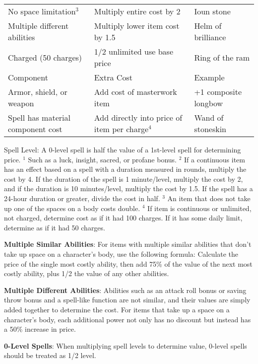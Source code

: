 \begin{table}[]
\begin{tabular}{lll}
 No space limitation\(^{3}\) & Multiply entire cost by 2 & Ioun stone \\
 Multiple different abilities & Multiply lower item cost by 1.5  & Helm of brilliance \\
 Charged (50 charges) & 1/2 unlimited use base price & Ring of the ram\\
Component & Extra Cost & Example\\
Armor, shield, or weapon & Add cost of masterwork item & +1 composite longbow \\
 Spell has material component cost & Add directly into price of item per charge\(^{4}\) & Wand of stoneskin\\
 \end{tabular}
Spell Level: A 0-level spell is half the value of a 1st-level spell for determining price.
\(^{1}\) Such as a luck, insight, sacred, or profane bonus.
\(^{2}\) If a continuous item has an effect based on a spell with a duration measured in rounds, multiply the cost by 4. If the duration of the spell is 1 minute/level, multiply the cost by 2, and if the duration is 10 minutes/level, multiply the cost by 1.5. If the spell has a 24-hour duration or greater, divide the cost in half.
\(^{3}\) An item that does not take up one of the spaces on a body costs double.
\(^{4}\) If item is continuous or unlimited, not charged, determine cost as if it had 100 charges. If it has some daily limit, determine as if it had 50 charges.

\end{table}
		
	
				
\textbf{Multiple Similar Abilities}: For items with multiple similar abilities that don't take up space on a character's body, use the following formula: Calculate the price of the single most costly ability, then add 75\% of the value of the next most costly ability, plus 1/2 the value of any other abilities.
				
\textbf{Multiple Different Abilities}: Abilities such as an attack roll bonus or saving throw bonus and a spell-like function are not similar, and their values are simply added together to determine the cost. For items that take up a space on a character's body, each additional power not only has no discount but instead has a 50\% increase in price.
				
\textbf{0-Level Spells}: When multiplying spell levels to determine value, 0-level spells should be treated as 1/2 level.
				
